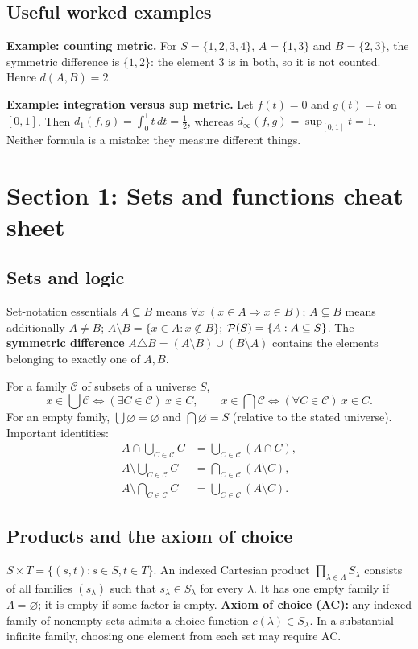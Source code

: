 \documentclass[11pt,a4paper]{article}
\begin{document}
\subsection{Useful worked examples}
\textbf{Example: counting metric.} For $S=\{1,2,3,4\}$, $A=\{1,3\}$ and $B=\{2,3\}$, the symmetric difference is $\{1,2\}$: the element $3$ is in both, so it is not counted. Hence $d(A,B)=2$.

\textbf{Example: integration versus sup metric.} Let $f(t)=0$ and $g(t)=t$ on $[0,1]$. Then $d_1(f,g)=\int_0^1t\,dt=\tfrac12$, whereas $d_\infty(f,g)=\sup_{[0,1]}t=1$. Neither formula is a mistake: they measure different things.
\section{Section 1: Sets and functions cheat sheet}
\subsection{Sets and logic}
\begin{keybox}{Set-notation essentials}
$A\subseteq B$ means $\forall x\;(x\in A\Rightarrow x\in B)$; $A\subsetneq B$ means additionally $A\neq B$; $A\setminus B=\{x\in A:x\notin B\}$; $\mathcal P(S)=\{A:A\subseteq S\}$. The \textbf{symmetric difference} $A\triangle B=(A\setminus B)\cup(B\setminus A)$ contains the elements belonging to exactly one of $A,B$.\end{keybox}
For a family $\mathcal C$ of subsets of a universe $S$,
\[x\in\bigcup\mathcal C\iff(\exists C\in\mathcal C)\ x\in C,\qquad x\in\bigcap\mathcal C\iff(\forall C\in\mathcal C)\ x\in C.\]
For an empty family, $\bigcup\varnothing=\varnothing$ and $\bigcap\varnothing=S$ (relative to the stated universe). Important identities:
\begin{align*}A\cap\bigcup_{C\in\mathcal C}C&=\bigcup_{C\in\mathcal C}(A\cap C),\\ A\setminus\bigcup_{C\in\mathcal C}C&=\bigcap_{C\in\mathcal C}(A\setminus C),\\ A\setminus\bigcap_{C\in\mathcal C}C&=\bigcup_{C\in\mathcal C}(A\setminus C).\end{align*}
\subsection{Products and the axiom of choice}
$S\times T=\{(s,t):s\in S,t\in T\}$. An indexed Cartesian product $\prod_{\lambda\in\Lambda}S_\lambda$ consists of all families $(s_\lambda)$ such that $s_\lambda\in S_\lambda$ for every $\lambda$. It has one empty family if $\Lambda=\varnothing$; it is empty if some factor is empty. \textbf{Axiom of choice (AC):} any indexed family of nonempty sets admits a choice function $c(\lambda)\in S_\lambda$. In a substantial infinite family, choosing one element from each set may require AC.
\end{document}
